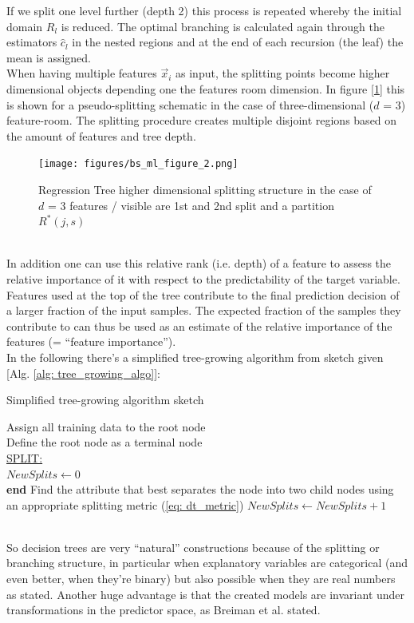 \documentclass[12pt, a4paper]{article}
\begin{document}
If we split one level further (depth 2) this process is repeated whereby the initial domain $R_l$ is reduced. The optimal branching is calculated again through the estimators $\hat{c}_l$ in the nested regions and at the end of each recursion (the leaf) the mean is assigned.\\
When having multiple features $\vec{x}_i$ as input, the splitting points become higher dimensional objects depending one the features room dimension. In figure [\ref{fig: rt_spliting_dim}] this is shown for a pseudo-splitting schematic in the case of three-dimensional ($d$ = 3) feature-room. The splitting procedure creates multiple disjoint regions based on the amount of features and tree depth.
\begin{figure}[!htpb]
    \centering
    \texttt{[image: figures/bs\_ml\_figure\_2.png]}
    \caption[Regression Tree higher dimensional splitting structure]{Regression Tree higher dimensional splitting structure in the case of $d$ = 3 features / visible are 1st and 2nd split and a partition $R^{\ast}(j,s)$}
    \label{fig: rt_spliting_dim}
\end{figure}
\\
In addition one can use this relative rank (i.e. depth) of a feature to assess the relative importance of it with respect to the predictability of the target variable. Features used at the top of the tree contribute to the final prediction decision of a larger fraction of the input samples. The expected fraction of the samples they contribute to can thus be used as an estimate of the relative importance of the features (= ``feature importance''). \\
In the following there's a simplified tree-growing algorithm from sketch given [Alg. \ref{alg: tree_growing_algo}]:
\begin{algorithm}
\caption{Simplified tree-growing algorithm sketch \cite{Steinberg2009}}\label{alg: tree_growing_algo}
    Assign all training data to the root node \\
    Define the root node as a terminal node \\
    \underline{SPLIT:} \\
    $NewSplits \gets 0$ \\
    {
        {\textbf{end}}
        {Find the attribute that best separates the node into two child nodes using an appropriate splitting metric (\ref{eq: dt_metric})}
        $NewSplits \gets NewSplits + 1$
    }
\end{algorithm}
\\
So decision trees are very ``natural'' constructions because of the splitting or branching structure, in particular when explanatory variables are categorical (and even better, when they're binary) but also possible when they are real numbers as stated. Another huge advantage is that the created models are invariant under transformations in the predictor space, as Breiman et al. \cite{Breiman1984} stated.
\end{document}
